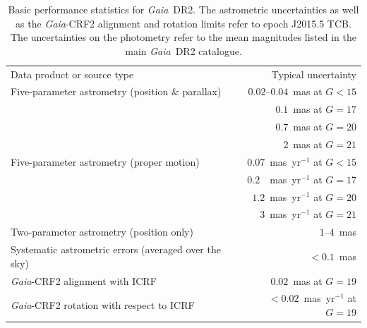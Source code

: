 \documentclass[longauth]{aa_gaia} %
\newcommand\gaia{\textit{Gaia}}
\newcommand\gdr[1]{\gaia~DR#1}
\begin{document}
\begin{table}[ht]
  \caption{Basic performance statistics for \gdr{2}. The astrometric uncertainties as well as the
    \gaia-CRF2 alignment and rotation limits refer to epoch J2015.5 TCB. The uncertainties on the
    photometry refer to the mean magnitudes listed in the main \gdr{2}
  catalogue.\label{tab:qualitystats}}
  \centering
  \begin{tabular}{lr}   
    \hline\hline        
    \noalign{\smallskip}
    Data product or source type                                               & Typical uncertainty\\
    \noalign{\smallskip}
    \hline
    \noalign{\smallskip}
    Five-parameter astrometry (position \& parallax)                          & $0.02$--$0.04$~mas at $G<15$\\
                                                                              & $0.1$~mas at $G=17$\\
                                                                              & $0.7$~mas at $G=20$\\
                                                                              & $2$~mas at
                                                                              $G=21$\\
    \noalign{\smallskip}
    Five-parameter astrometry (proper motion)                                 & $0.07$~mas~yr$^{-1}$ at $G<15$\\
                                                                              & $0.2$~~mas~yr$^{-1}$ at $G=17$\\
                                                                              & $1.2$~mas~yr$^{-1}$ at $G=20$\\
                                                                              & $3$~mas~yr$^{-1}$ at $G=21$\\
    \noalign{\smallskip}
    Two-parameter astrometry (position only)                                  & $1$--$4$~mas\\
    \noalign{\smallskip}
    Systematic astrometric errors (averaged over the sky)                     & $<0.1$~mas\\
    \noalign{\smallskip}
    \gaia-CRF2 alignment with ICRF                                            & $0.02$~mas at $G=19$\\
    \gaia-CRF2 rotation with respect to ICRF                                  & $<0.02$~mas~yr$^{-1}$ at $G=19$\\

\end{tabular}
\end{table}
\end{document}
